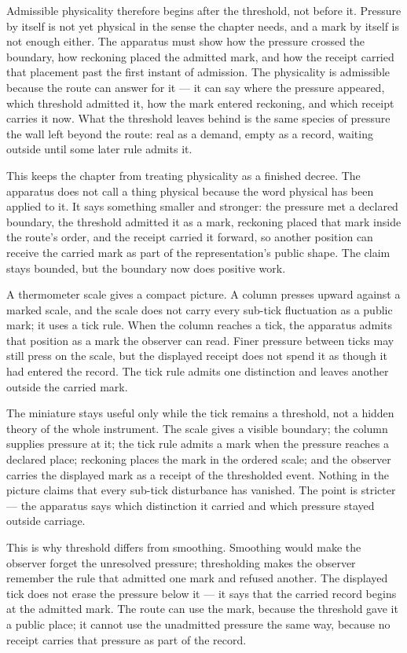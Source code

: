 Admissible physicality therefore begins after the threshold, not before it. Pressure by itself is not yet physical in the sense the chapter needs, and a mark by itself is not enough either. The apparatus must show how the pressure crossed the boundary, how reckoning placed the admitted mark, and how the receipt carried that placement past the first instant of admission. The physicality is admissible because the route can answer for it --- it can say where the pressure appeared, which threshold admitted it, how the mark entered reckoning, and which receipt carries it now. What the threshold leaves behind is the same species of pressure the wall left beyond the route: real as a demand, empty as a record, waiting outside until some later rule admits it.

This keeps the chapter from treating physicality as a finished decree. The apparatus does not call a thing physical because the word physical has been applied to it. It says something smaller and stronger: the pressure met a declared boundary, the threshold admitted it as a mark, reckoning placed that mark inside the route's order, and the receipt carried it forward, so another position can receive the carried mark as part of the representation's public shape. The claim stays bounded, but the boundary now does positive work.

A thermometer scale gives a compact picture. A column presses upward against a marked scale, and the scale does not carry every sub-tick fluctuation as a public mark; it uses a tick rule. When the column reaches a tick, the apparatus admits that position as a mark the observer can read. Finer pressure between ticks may still press on the scale, but the displayed receipt does not spend it as though it had entered the record. The tick rule admits one distinction and leaves another outside the carried mark.

The miniature stays useful only while the tick remains a threshold, not a hidden theory of the whole instrument. The scale gives a visible boundary; the column supplies pressure at it; the tick rule admits a mark when the pressure reaches a declared place; reckoning places the mark in the ordered scale; and the observer carries the displayed mark as a receipt of the thresholded event. Nothing in the picture claims that every sub-tick disturbance has vanished. The point is stricter --- the apparatus says which distinction it carried and which pressure stayed outside carriage.

This is why threshold differs from smoothing. Smoothing would make the observer forget the unresolved pressure; thresholding makes the observer remember the rule that admitted one mark and refused another. The displayed tick does not erase the pressure below it --- it says that the carried record begins at the admitted mark. The route can use the mark, because the threshold gave it a public place; it cannot use the unadmitted pressure the same way, because no receipt carries that pressure as part of the record.

